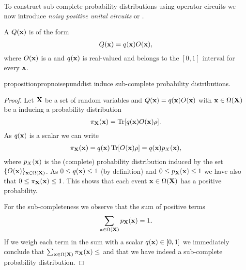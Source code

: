 To construct sub-complete probability distributions using operator circuits we now introduce \textit{noisy positive unital circuits} or \noisepuncs.

\begin{definition}
	\label{def:noisepunc}
	A \noisepunc $Q(\mathbf{x})$ is of the form
	\begin{align}
		Q(\mathbf{x})= q(\mathbf{x}) O(\mathbf{x}),
	\end{align}
	where $O(\mathbf{x})$ is a \punc and $q(\mathbf{x})$ is real-valued and belongs to the  $[0,1]$ interval for every $\mathbf{x}$.
\end{definition}



\begin{restatable}{proposition}{propnoisepunddist}
	\label{prop:noisepunddist}
	\noisepuncs induce sub-complete probability distributions.
\end{restatable}

\begin{proof}
	Let $\mathbf{X}$ be a set of random variables and  $Q(\mathbf{x})= q(\mathbf{x})O(\mathbf{x})$ with $\mathbf{x}\in \Omega(\mathbf{X})$ be a \noisepunc inducing a probability distribution
	\begin{align}
		\pi_{\mathbf{X}}(\mathbf{x}) = \Tr [ q(\mathbf{x})O(\mathbf{x}) \rho].
	\end{align}
	As $q(\mathbf{x})$ is a scalar we can write
	\begin{align}
		\pi_{\mathbf{X}}(\mathbf{x}) = q(\mathbf{x}) \Tr [ O(\mathbf{x}) \rho] = q(\mathbf{x}) p_X(\mathbf{x}),
	\end{align}
	where $p_X(\mathbf{x})$ is the (complete) probability distribution induced by the set $\{ O(\mathbf{x}) \}_{\mathbf{x} \in \Omega(\mathbf{X})}$. As $0\leq q(\mathbf{x})\leq 1$ (by definition) and $0\leq p_{\mathbf{X}}(\mathbf{x})\leq 1$ we have also that $0\leq \pi_{\mathbf{X}}(\mathbf{x})\leq 1$. This shows that each event $\mathbf{x}\in \Omega(\mathbf{X})$ has a positive probability.

	For the sub-completeness we observe that the sum of positive terms
	\begin{align}
		\sum_{\mathbf{x} \in \Omega(\mathbf{X})} p_{\mathbf{X}}(\mathbf{x})=1.
	\end{align}
	If we weigh each term in the sum with a scalar $q(\mathbf{x}) \in [0,1]$ we immediately conclude that $\sum_{\mathbf{x} \in \Omega(\mathbf{X})} \pi_{\mathbf{X}} (\mathbf{x})\leq$ and that we have indeed a sub-complete probability distribution.
\end{proof}



